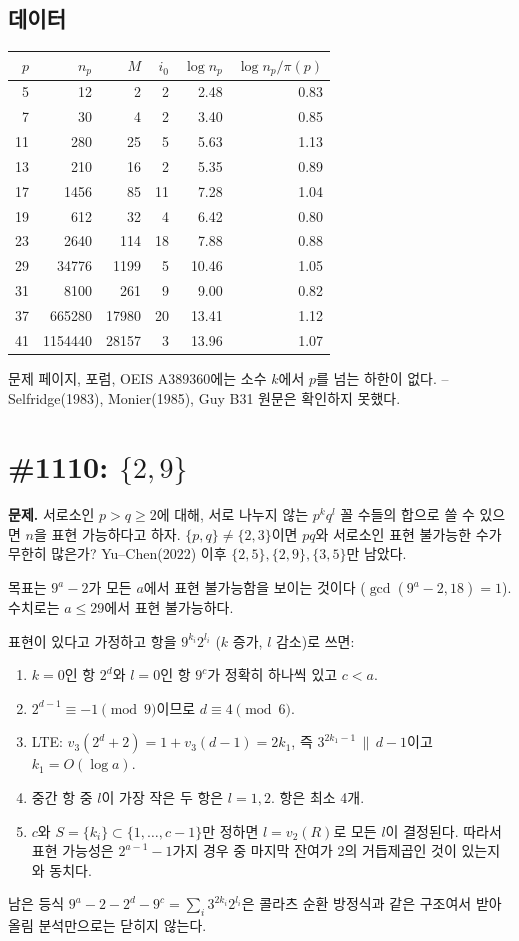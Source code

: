\documentclass[11pt]{article}
\begin{document}
\subsection{데이터}
\begin{center}
\begin{tabular}{rrrrrr}
\toprule
$p$ & $n_p$ & $M$ & $i_0$ & $\log n_p$ & $\log n_p/\pi(p)$\\
\midrule
5 & 12 & 2 & 2 & 2.48 & 0.83\\
7 & 30 & 4 & 2 & 3.40 & 0.85\\
11 & 280 & 25 & 5 & 5.63 & 1.13\\
13 & 210 & 16 & 2 & 5.35 & 0.89\\
17 & 1456 & 85 & 11 & 7.28 & 1.04\\
19 & 612 & 32 & 4 & 6.42 & 0.80\\
23 & 2640 & 114 & 18 & 7.88 & 0.88\\
29 & 34776 & 1199 & 5 & 10.46 & 1.05\\
31 & 8100 & 261 & 9 & 9.00 & 0.82\\
37 & 665280 & 17980 & 20 & 13.41 & 1.12\\
41 & 1154440 & 28157 & 3 & 13.96 & 1.07\\
\bottomrule
\end{tabular}
\end{center}
문제 페이지, 포럼, OEIS A389360에는 소수 $k$에서 $p$를 넘는 하한이 없다. \Erdos{}–Selfridge(1983), Monier(1985), Guy B31 원문은 확인하지 못했다.

\section{\Erdos{} \#1110: $\{2,9\}$}
\textbf{문제.} 서로소인 $p>q\ge2$에 대해, 서로 나누지 않는 $p^kq^l$ 꼴 수들의 합으로 쓸 수 있으면 $n$을 표현 가능하다고 하자. $\{p,q\}\ne\{2,3\}$이면 $pq$와 서로소인 표현 불가능한 수가 무한히 많은가? Yu–Chen(2022) 이후 $\{2,5\},\{2,9\},\{3,5\}$만 남았다.

목표는 $9^a-2$가 모든 $a$에서 표현 불가능함을 보이는 것이다 ($\gcd(9^a-2,18)=1$). 수치로는 $a\le29$에서 표현 불가능하다.

표현이 있다고 가정하고 항을 $9^{k_i}2^{l_i}$ ($k$ 증가, $l$ 감소)로 쓰면:
\begin{enumerate}[nosep]
\item $k=0$인 항 $2^d$와 $l=0$인 항 $9^c$가 정확히 하나씩 있고 $c<a$.
\item $2^{d-1}\equiv-1\pmod9$이므로 $d\equiv4\pmod6$.
\item LTE: $v_3(2^d+2)=1+v_3(d-1)=2k_1$, 즉 $3^{2k_1-1}\,\|\,d-1$이고 $k_1=O(\log a)$.
\item 중간 항 중 $l$이 가장 작은 두 항은 $l=1,2$. 항은 최소 4개.
\item $c$와 $S=\{k_i\}\subset\{1,\dots,c-1\}$만 정하면 $l=v_2(R)$로 모든 $l$이 결정된다. 따라서 표현 가능성은 $2^{a-1}-1$가지 경우 중 마지막 잔여가 2의 거듭제곱인 것이 있는지와 동치다.
\end{enumerate}
남은 등식 $9^a-2-2^d-9^c=\sum_i3^{2k_i}2^{l_i}$은 콜라츠 순환 방정식과 같은 구조여서 받아올림 분석만으로는 닫히지 않는다.
\end{document}
